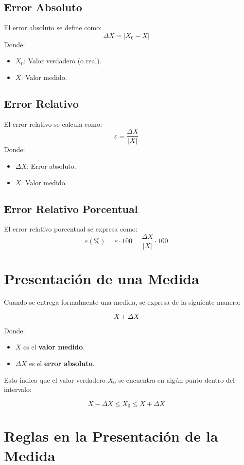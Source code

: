 \subsection{Error Absoluto}
El error absoluto se define como:
\[
\Delta X = |X_0 - X|
\]
Donde:
\begin{itemize}
    \item \( X_0 \): Valor verdadero (o real).
    \item \( X \): Valor medido.
\end{itemize}

\subsection{Error Relativo}
El error relativo se calcula como:
\[
\varepsilon = \frac{\Delta X}{|X|}
\]
Donde:
\begin{itemize}
    \item \( \Delta X \): Error absoluto.
    \item \( X \): Valor medido.
\end{itemize}

\subsection{Error Relativo Porcentual}
El error relativo porcentual se expresa como:
\[
\varepsilon (\%) = \varepsilon \cdot 100 = \frac{\Delta X}{|X|} \cdot 100
\]


\section {Presentación de una Medida}

Cuando se entrega formalmente una medida, se expresa de la siguiente manera:

\[
X \pm \Delta X
\]

Donde:
\begin{itemize}
    \item \( X \) es el \textbf{valor medido}.
    \item \( \Delta X \) es el \textbf{error absoluto}.
\end{itemize}

\noindent Esto indica que el valor verdadero \( X_0 \) se encuentra en algún punto dentro del intervalo:

\[
X - \Delta X \leq X_0 \leq X + \Delta X
\]

\section{Reglas en la Presentación de la Medida}

